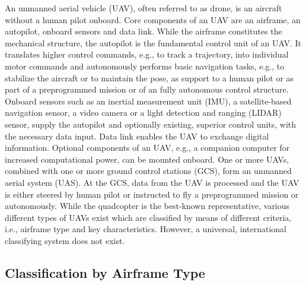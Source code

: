 An unmanned aerial vehicle (UAV),
often referred to as drone, is an
aircraft without a human pilot onboard.
Core components of an UAV are an airframe,
an autopilot, onboard sensors and 
data link. 
While the airframe constitutes the mechanical structure,
the autopilot is the fundamental control unit of an UAV.
It translates higher control commands,
e.g., to track a trajectory,
into individual motor commands
and autonomously performs basic navigation tasks,
e.g., to stabilize the aircraft or to maintain the pose,
as support to a human pilot or as part of a preprogrammed mission
or of an fully autonomous control structure.
Onboard sensors such as
an inertial measurement unit (IMU), 
a satellite-based navigation sensor,
a video camera
or a light detection and ranging (LIDAR) sensor, 
supply the autopilot and optionally
existing, superior control units,
with the necessary data input.
Data link enables the UAV to
exchange digital information.
Optional components of an UAV,
e.g., a companion computer
for increased computational power,
can be mounted onboard.
One or more UAVs,
combined with one or more
ground control stations (GCS),
form an unmanned aerial system (UAS).
At the GCS, data from the UAV
is processed and the UAV 
is either steered by human pilot or
instructed to fly a preprogrammed mission or autonomously.
While the quadcopter is the best-known representative,
various different types of UAVs exist
which are classified by means of
different criteria, 
i.e., airframe type and key characteristics.
\cite{Fahlstrom2012}
However, a universal, international classifying system
does not exist.


\subsection{Classification by Airframe Type} \label{Chapter2Section1Sub1}

